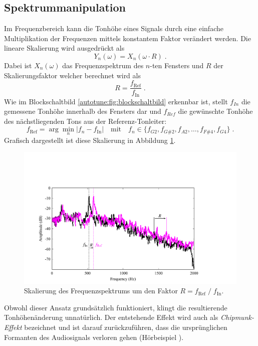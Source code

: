 \subsection{Spektrummanipulation
\label{autotune:subsection:spektrumManipulation}}
Im Frequenzbereich kann die Tonhöhe eines Signals durch eine einfache Multiplikation der Frequenzen mittels konstantem Faktor verändert werden.
Die lineare Skalierung wird ausgedrückt als
\begin{equation}
    Y_n(\omega)
    =
    X_n(\omega \cdot R) \;.
\end{equation}
Dabei ist $X_n(\omega)$ das Frequenzspektrum des $n$-ten Fensters und $R$ der Skalierungsfaktor welcher berechnet wird als
\begin{equation}
    R
    =
    \frac{f_{\text{Ref}}}{{f_{\text{In}}}} \;.
\end{equation}
Wie im Blockschaltbild \ref{autotune:fig:blockschaltbild} erkennbar ist,
stellt $f_{In}$ die gemessene Tonhöhe innerhalb des Fensters dar und $f_{Ref}$ die gewünschte Tonhöhe des nächstliegenden Tons aus der Referenz-Tonleiter:
\begin{equation}
    f_{\text{Ref}}
    =
    \arg\min_n \left| f_n - f_{\text{In}} \right|
    \quad \text{mit} \quad
    f_n \in \{ f_{G2}, f_{G\#2}, f_{A2}, \ldots, f_{F\#4}, f_{G4} \} \; .
\end{equation}
Grafisch dargestellt ist diese Skalierung in Abbildung \ref{autotune:fig:spektrumManipulation}.
\begin{figure}
    \centering
    \includegraphics[width=\textwidth]{papers/autotune/images/Spektrum-Manipulation.pdf}
    \caption{Skalierung des Frequenzspektrums um den Faktor $R = f_\text{Ref} \;/\;f_\text{In}$\;.}
    \label{autotune:fig:spektrumManipulation}
\end{figure}
Obwohl dieser Ansatz grundsätzlich funktioniert, klingt die resultierende Tonhöhenänderung unnatürlich.
Der entstehende Effekt wird auch als \emph{Chipmunk-Effekt} bezeichnet und ist darauf zurückzuführen,
%
dass die ursprünglichen Formanten des Audiosignals verloren gehen (Hörbeispiel \cite{autotune:audioExampleChipmunkEffect}).

